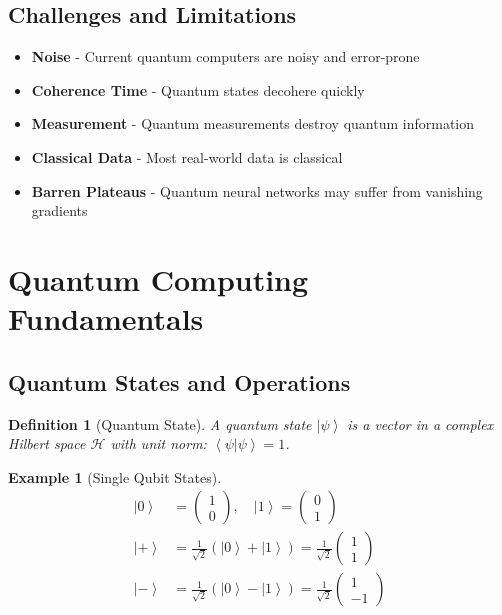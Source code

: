 \documentclass[11pt]{article}
\newtheorem{definition}{Definition}[section]
\newtheorem{example}{Example}[section]
\newcommand{\ket}[1]{\left|#1\right\rangle}
\newcommand{\braket}[2]{\left\langle#1|#2\right\rangle}
\begin{document}
\subsection{Challenges and Limitations}

\begin{itemize}
    \item \textbf{Noise} - Current quantum computers are noisy and error-prone
    \item \textbf{Coherence Time} - Quantum states decohere quickly
    \item \textbf{Measurement} - Quantum measurements destroy quantum information
    \item \textbf{Classical Data} - Most real-world data is classical
    \item \textbf{Barren Plateaus} - Quantum neural networks may suffer from vanishing gradients
\end{itemize}

\section{Quantum Computing Fundamentals}

\subsection{Quantum States and Operations}

\begin{definition}[Quantum State]
A quantum state $\ket{\psi}$ is a vector in a complex Hilbert space $\mathcal{H}$ with unit norm: $\braket{\psi}{\psi} = 1$.
\end{definition}

\begin{example}[Single Qubit States]
\begin{align}
\ket{0} &= \begin{pmatrix} 1 \\ 0 \end{pmatrix}, \quad
\ket{1} = \begin{pmatrix} 0 \\ 1 \end{pmatrix} \\
\ket{+} &= \frac{1}{\sqrt{2}}(\ket{0} + \ket{1}) = \frac{1}{\sqrt{2}}\begin{pmatrix} 1 \\ 1 \end{pmatrix} \\
\ket{-} &= \frac{1}{\sqrt{2}}(\ket{0} - \ket{1}) = \frac{1}{\sqrt{2}}\begin{pmatrix} 1 \\ -1 \end{pmatrix}
\end{align}
\end{example}
\end{document}
